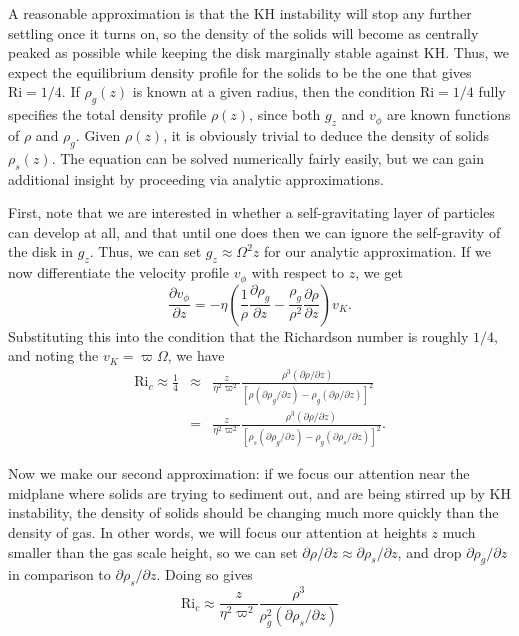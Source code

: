 A reasonable approximation is that the KH instability will stop any further settling once it turns on, so the density of the solids will become as centrally peaked as possible while keeping the disk marginally stable against KH. Thus, we expect the equilibrium density profile for the solids to be the one that gives $\mbox{Ri}=1/4$. If $\rho_g(z)$ is known at a given radius, then the condition $\mbox{Ri} =1/4$ fully specifies the total density profile $\rho(z)$, since both $g_z$ and $v_\phi$ are known functions of $\rho$ and $\rho_g$. Given $\rho(z)$, it is obviously trivial to deduce the density of solids $\rho_s(z)$. The equation can be solved numerically fairly easily, but we can gain additional insight by proceeding via analytic approximations.

First, note that we are interested in whether a self-gravitating layer of particles can develop at all, and that until one does then we can ignore the self-gravity of the disk in $g_z$. Thus, we can set $g_z\approx \Omega^2 z$ for our analytic approximation. If we now differentiate the velocity profile $v_{\phi}$ with respect to $z$, we get
\begin{equation}
\frac{\partial v_\phi}{\partial z} = -\eta \left(\frac{1}{\rho} \frac{\partial \rho_g}{\partial z} - \frac{\rho_g}{\rho^2}\frac{\partial \rho}{\partial z}\right) v_K.
\end{equation}
Substituting this into the condition that the Richardson number is roughly $1/4$, and noting the $v_K = \varpi\Omega$, we have
\begin{eqnarray}
\mbox{Ri}_c \approx \frac{1}{4} 
& \approx &
\frac{z}{\eta^2 \varpi^2} \frac{\rho^3 (\partial \rho/\partial z)}{\left[\rho (\partial \rho_g/\partial z) - \rho_g (\partial \rho/\partial z)\right]^2} \\
& = &
\frac{z}{\eta^2 \varpi^2} \frac{\rho^3 (\partial \rho/\partial z)}{\left[\rho_s (\partial \rho_g/ \partial z) - \rho_g (\partial \rho_s/\partial z)\right]^2}.
\end{eqnarray}

Now we make our second approximation: if we focus our attention near the midplane where solids are trying to sediment out, and are being stirred up by KH instability, the density of solids should be changing much more quickly than the density of gas. In other words, we will focus our attention at heights $z$ much smaller than the gas scale height, so we can set $\partial \rho/\partial z \approx \partial \rho_s/\partial z$, and drop $\partial \rho_g/\partial z$ in comparison to $\partial \rho_s/\partial z$. Doing so gives
\begin{equation}
\mbox{Ri}_c \approx \frac{z}{\eta^2 \varpi^2} \frac{\rho^3}{\rho_g^2 (\partial\rho_s/\partial z)}
\end{equation}

